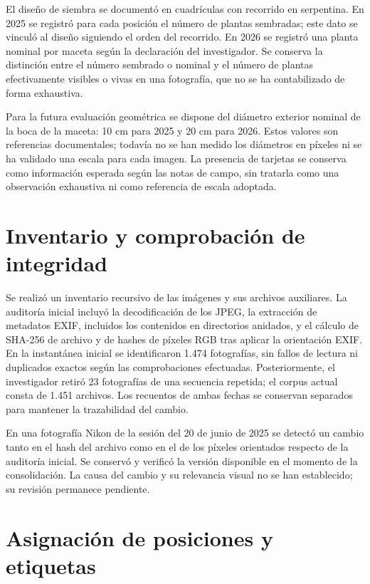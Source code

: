 El diseño de siembra se documentó en cuadrículas con recorrido en serpentina. En 2025 se registró para cada posición el número de plantas sembradas; este dato se vinculó al diseño siguiendo el orden del recorrido. En 2026 se registró una planta nominal por maceta según la declaración del investigador. Se conserva la distinción entre el número sembrado o nominal y el número de plantas efectivamente visibles o vivas en una fotografía, que no se ha contabilizado de forma exhaustiva.

Para la futura evaluación geométrica se dispone del diámetro exterior nominal de la boca de la maceta: 10 cm para 2025 y 20 cm para 2026. Estos valores son referencias documentales; todavía no se han medido los diámetros en píxeles ni se ha validado una escala para cada imagen. La presencia de tarjetas se conserva como información esperada según las notas de campo, sin tratarla como una observación exhaustiva ni como referencia de escala adoptada.

\section{Inventario y comprobación de integridad}

Se realizó un inventario recursivo de las imágenes y sus archivos auxiliares. La auditoría inicial incluyó la decodificación de los JPEG, la extracción de metadatos EXIF, incluidos los contenidos en directorios anidados, y el cálculo de SHA-256 de archivo y de hashes de píxeles RGB tras aplicar la orientación EXIF. En la instantánea inicial se identificaron 1.474 fotografías, sin fallos de lectura ni duplicados exactos según las comprobaciones efectuadas. Posteriormente, el investigador retiró 23 fotografías de una secuencia repetida; el corpus actual consta de 1.451 archivos. Los recuentos de ambas fechas se conservan separados para mantener la trazabilidad del cambio.

En una fotografía Nikon de la sesión del 20 de junio de 2025 se detectó un cambio tanto en el hash del archivo como en el de los píxeles orientados respecto de la auditoría inicial. Se conservó y verificó la versión disponible en el momento de la consolidación. La causa del cambio y su relevancia visual no se han establecido; su revisión permanece pendiente.

\section{Asignación de posiciones y etiquetas}

